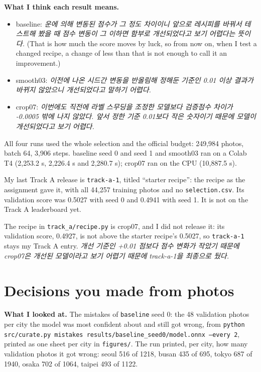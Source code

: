 \documentclass[11pt]{article}
\begin{document}
\textbf{What I think each result means.}
\begin{itemize}
\item baseline: \emph{운에 의해 변동된 점수가 그 정도 차이이니 앞으로 레시피를
  바꿔서 테스트해 봤을 때 점수 변동이 그 이하면 함부로 개선되었다고 보기
  어렵다는 뜻이다.} (That is how much the score moves by luck, so from now on,
  when I test a changed recipe, a change of less than that is not enough to call
  it an improvement.)
\item smooth03: \emph{이전에 나온 시드간 변동을 반올림해 정해둔 기준인 0.01 이상
  결과가 바뀌지 않았으니 개선되었다고 말하기 어렵다.}
\item crop07: \emph{이번에도 직전에 라벨 스무딩을 조정한 모델보다 검증점수 차이가
  -0.0005 밖에 나지 않았다. 앞서 정한 기준 0.01보다 작은 숫자이기 때문에 모델이
  개선되었다고 보기 어렵다.}
\end{itemize}

All four runs used the whole selection and the official budget: 249{,}984 photos,
batch 64, 3{,}906 steps. baseline seed 0 and seed 1 and smooth03 ran on a Colab
T4 (2{,}253.2 s, 2{,}226.4 s and 2{,}280.7 s); crop07 ran on the CPU
(10{,}887.5 s).

My last Track A release is \texttt{track-a-1}, titled ``starter recipe'': the
recipe as the assignment gave it, with all 44{,}257 training photos and no
\texttt{selection.csv}. Its validation score was 0.5027 with seed 0 and 0.4941
with seed 1. It is not on the Track A leaderboard yet.

The recipe in \texttt{track\_a/recipe.py} is crop07, and I did not release it:
its validation score, 0.4927, is not above the starter recipe's 0.5027, so
\texttt{track-a-1} stays my Track A entry.
\emph{개선 기준인 +0.01 점보다 점수 변화가 작았기 때문에 crop07은 개선된 모델이라고
보기 어렵기 때문에 track-a-1을 최종으로 뒀다.}

\section*{Decisions you made from photos}


\textbf{What I looked at.} The mistakes of \texttt{baseline} seed 0: the 48
validation photos per city the model was most confident about and still got
wrong, from \texttt{python src/curate.py mistakes
results/baseline\_seed0/model.onnx --every 2}, printed as one sheet per city in
\texttt{figures/}. The run printed, per city, how many validation photos it got
wrong: seoul 516 of 1218, busan 435 of 695, tokyo 687 of 1940, osaka 702 of
1064, taipei 493 of 1122.
\end{document}
